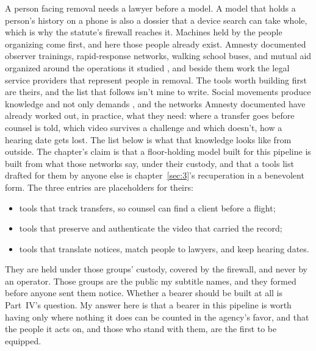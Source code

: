 A person facing removal needs a lawyer before a model. A model that holds a person's history on a phone is also a dossier that a device search can take whole, which is why the statute's firewall reaches it. Machines held by the people organizing come first, and here those people already exist. Amnesty documented observer trainings, rapid-response networks, walking school buses, and mutual aid organized around the operations it studied \autocite{Amnesty2026Whistles}, and beside them work the legal service providers that represent people in removal. The tools worth building first are theirs, and the list that follows isn't mine to write. Social movements produce knowledge and not only demands \autocite{kelley2002freedom}, and the networks Amnesty documented have already worked out, in practice, what they need: where a transfer goes before counsel is told, which video survives a challenge and which doesn't, how a hearing date gets lost. The list below is what that knowledge looks like from outside. The chapter's claim is that a floor-holding model built for this pipeline is built from what those networks say, under their custody, and that a tools list drafted for them by anyone else is chapter~\ref{sec:3}'s recuperation in a benevolent form. The three entries are placeholders for theirs:

\begin{itemize}
\item tools that track transfers, so counsel can find a client before a flight;
\item tools that preserve and authenticate the video that carried the record;
\item tools that translate notices, match people to lawyers, and keep hearing dates.
\end{itemize}

They are held under those groups' custody, covered by the firewall, and never by an operator. Those groups are the public my subtitle names, and they formed before anyone sent them notice. Whether a bearer should be built at all is Part~IV's question. My answer here is that a bearer in this pipeline is worth having only where nothing it does can be counted in the agency's favor, and that the people it acts on, and those who stand with them, are the first to be equipped.

